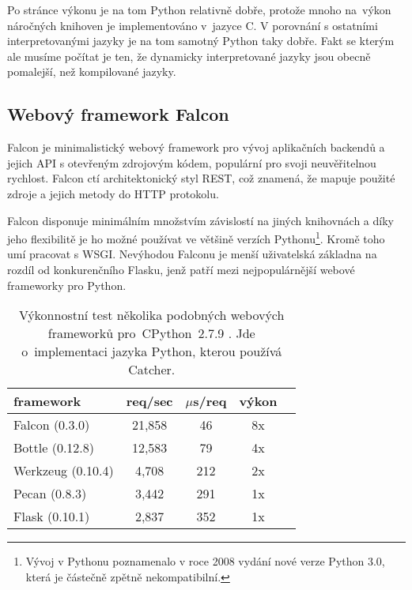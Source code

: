 \medskip

Po stránce výkonu je na tom Python relativně dobře, protože mnoho na~výkon náročných knihoven je implementováno v~jazyce C.
V porovnání s ostatními interpretovanými jazyky je na tom samotný Python taky dobře.
Fakt se kterým ale musíme počítat je ten, že dynamicky interpretované jazyky jsou obecně pomalejší, než kompilované jazyky.

\subsection{Webový framework Falcon}


\indent

Falcon je minimalistický webový framework pro vývoj aplikačních backendů a jejich API s otevřeným zdrojovým kódem,
populární pro svoji neuvěřitelnou rychlost. Falcon ctí architektonický styl REST, což znamená, že mapuje použité
zdroje a jejich metody do HTTP protokolu.

\medskip

Falcon disponuje minimálním množstvím závislostí na jiných knihovnách a díky jeho flexibilitě je ho možné
používat ve většině verzích Pythonu\footnote{Vývoj v Pythonu poznamenalo v roce 2008 vydání nové verze Python 3.0,
která je částečně zpětně nekompatibilní.}. Kromě toho umí pracovat s WSGI. Nevýhodou Falconu je menší uživatelská
základna na rozdíl od konkurenčního Flasku, jenž patří mezi nejpopulárnější webové frameworky pro Python.

\begin{table}[htb]
 \centering
 \begin{tabular}{|l||c|c|c|c|}\hline
 \bfseries \bfseries framework & \bfseries req/sec & \bfseries $\mu$s/req & \bfseries výkon \\[2mm]
 \hline
 Falcon (0.3.0) & 21,858 & 46 & 8x \\
 \hline
 Bottle (0.12.8) & 12,583 & 79 & 4x \\
 \hline
 Werkzeug (0.10.4) & 4,708 & 212 & 2x \\
 \hline
 Pecan (0.8.3) & 3,442 & 291 & 1x \\
 \hline
 Flask (0.10.1) & 2,837 & 352 & 1x \\
 \hline
 \end{tabular}
 \caption{Výkonnostní test několika podobných webových frameworků pro~CPython~2.7.9 \cite{falcon-benchmarks}. Jde o~implementaci jazyka Python, kterou používá Catcher.}
\end{table}

